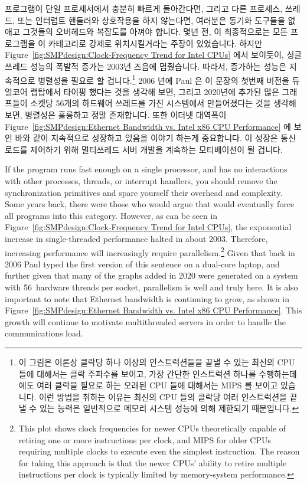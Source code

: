 프로그램이 단일 프로세서에서 충분히 빠르게 돌아간다면, 그리고 다른 프로세스,
쓰레드, 또는 인터럽트 핸들러와 상호작용을 하지 않는다면, 여러분은 동기화
도구들을 없애고 그것들의 오버헤드와 복잡도를 아껴야 합니다.
몇년 전,  이 최종적으로는 모든 프로그램을 이 카테고리로 강제로
위치시킬거라는 주장이 있었습니다.
하지만
Figure~\ref{fig:SMPdesign:Clock-Frequency Trend for Intel CPUs}
에서 보이듯이, 싱글쓰레드 성능의 폭발적 증가는 2003년 즈음에 멈췄습니다.
따라서, 증가하는 성능은 지속적으로 병렬성을 필요로 할 겁니다.\footnote{
	이 그림은 이론상 클락당 하나 이상의 인스트럭션들을 끝낼 수 있는 최신의
	CPU 들에 대해서는 클락 주파수를 보이고, 가장 간단한 인스트럭션 하나를
	수행하는데에도 여러 클락을 필요로 하는 오래된 CPU 들에 대해서는 MIPS 를
	보이고 있습니다.
	이런 방법을 취하는 이유는 최신의 CPU 들의 클락당 여러 인스트럭션을 끝낼
	수 있는 능력은 일반적으로 메모리 시스템 성능에 의해 제한되기
	때문입니다.}
2006 년에 Paul 은 이 문장의 첫번째 버전을 듀얼코어 랩탑에서 타이핑 했다는 것을
생각해 보면, 그리고 2020년에 추가된 많은 그래프들이 소켓당 56개의 하드웨어
쓰레드를 가진 시스템에서 만들어졌다는 것을 생각해보면, 병렬성은 훌륭하고 정말
존재합니다.
또한 이더넷 대역폭이
Figure~\ref{fig:SMPdesign:Ethernet Bandwidth vs. Intel x86 CPU Performance}
에 보인 바와 같이 지속적으로 성장하고 있음을 이야기 하는게 중요합니다.
이 성장은 통신 로드를 제어하기 위해 멀티쓰레드 서버 개발을 계속하는
모티베이션이 될 겁니다.

\iffalse

If the program runs fast enough on a single processor, and
has no interactions with other processes, threads, or interrupt
handlers, you should
remove the synchronization primitives and spare yourself their
overhead and complexity.
Some years back, there were those who would argue that 
would eventually force all programs into this category.
However, as can be seen in
Figure~\ref{fig:SMPdesign:Clock-Frequency Trend for Intel CPUs},
the exponential increase in single-threaded performance halted in
about 2003.
Therefore,
increasing performance will increasingly require parallelism.\footnote{
	This plot shows clock frequencies for newer CPUs theoretically
	capable of retiring one or more instructions per clock, and MIPS for
	older CPUs requiring multiple clocks to execute even the
	simplest instruction.
	The reason for taking this approach is that the newer CPUs'
	ability to retire multiple instructions per clock is typically
	limited by memory-system performance.}
Given that back in 2006 Paul typed the first version of this sentence
on a dual-core laptop, and further given that many of the graphs added
in 2020 were generated on a system with 56~hardware threads per socket,
parallelism is well and truly here.
It is also important to note that Ethernet bandwidth is continuing to
grow, as shown in
Figure~\ref{fig:SMPdesign:Ethernet Bandwidth vs. Intel x86 CPU Performance}.
This growth will continue to motivate multithreaded servers in order to
handle the communications load.

